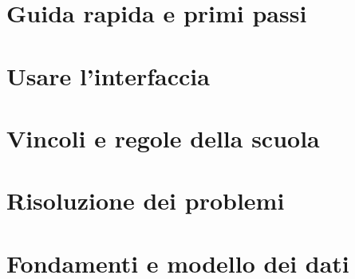 \part{Guida rapida e primi passi}
\label{part:guida_rapida}






\part{Usare l'interfaccia}
\label{part:uso_interfaccia}





\part{Vincoli e regole della scuola}
\label{part:vincoli}


\part{Risoluzione dei problemi}
\label{part:faq}



\part{Fondamenti e modello dei dati}
\label{part:fondamenti}






